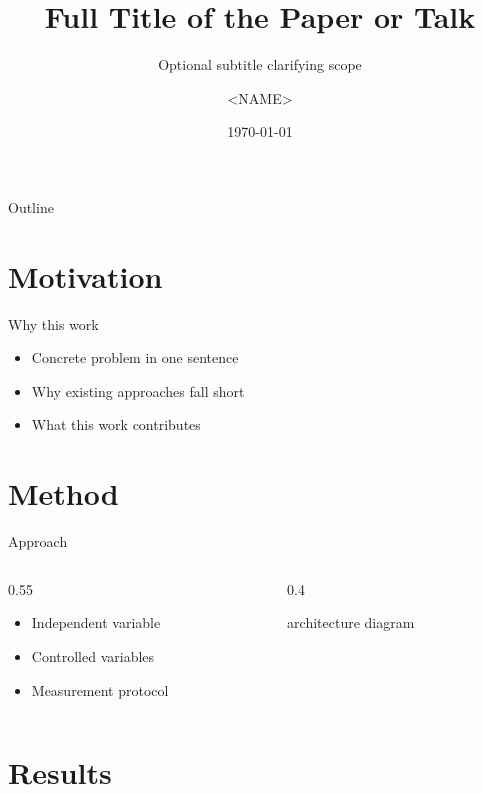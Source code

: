 \documentclass[aspectratio=169,12pt]{beamer}
\title[Short title]{Full Title of the Paper or Talk}
\subtitle{Optional subtitle clarifying scope}
\author[<SHORT-NAME>]{<NAME>}
\institute[<SHORT-INSTITUTE>]{<INSTITUTE>, <DEPARTMENT>}
\date{\today}
\begin{document}
\begin{frame}[plain]
  \titlepage
\end{frame}

\begin{frame}{Outline}
  \tableofcontents
\end{frame}

\section{Motivation}

\begin{frame}{Why this work}
  \begin{itemize}
    \item Concrete problem in one sentence
    \item Why existing approaches fall short
    \item What this work contributes
  \end{itemize}
\end{frame}

\section{Method}

\begin{frame}{Approach}
  \begin{columns}[T]
    \begin{column}{0.55\textwidth}
      \begin{itemize}
        \item Independent variable
        \item Controlled variables
        \item Measurement protocol
      \end{itemize}
    \end{column}
    \begin{column}{0.4\textwidth}
      \fbox{\rule{0pt}{4cm}\rule{\textwidth}{0pt}}
      \begin{center}\footnotesize architecture diagram\end{center}
    \end{column}
  \end{columns}
\end{frame}

\section{Results}
\end{document}
